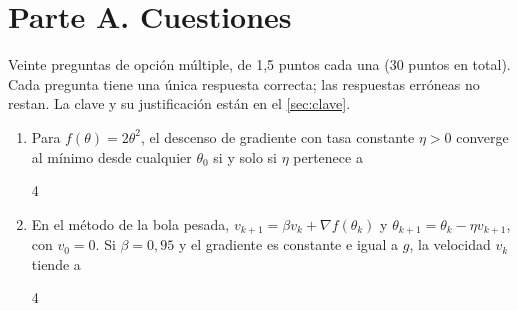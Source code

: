 \chapter*{Parte A. Cuestiones}
\label{cap:parteA}

Veinte preguntas de opción múltiple, de 1,5 puntos cada una (30 puntos en total). Cada pregunta tiene una única respuesta correcta; las respuestas erróneas no restan. La clave y su justificación están en el \cref{sec:clave}.

\begin{enumerate}[label=\textbf{\arabic*.},leftmargin=2em,itemsep=8pt,ref=\arabic*]

\item\label{q:1}  Para $f(\theta)=2\theta^{2}$, el descenso de gradiente con tasa constante $\eta>0$ converge al mínimo desde cualquier $\theta_0$ si y solo si $\eta$ pertenece a
\begin{multicols}{4}
\end{multicols}

\item\label{q:2}  En el método de la bola pesada, $v_{k+1}=\beta v_k+\nabla f(\theta_k)$ y $\theta_{k+1}=\theta_k-\eta v_{k+1}$, con $v_0=0$. Si $\beta=0{,}95$ y el gradiente es constante e igual a $g$, la velocidad $v_k$ tiende a
\begin{multicols}{4}
\end{multicols}


\end{enumerate}
